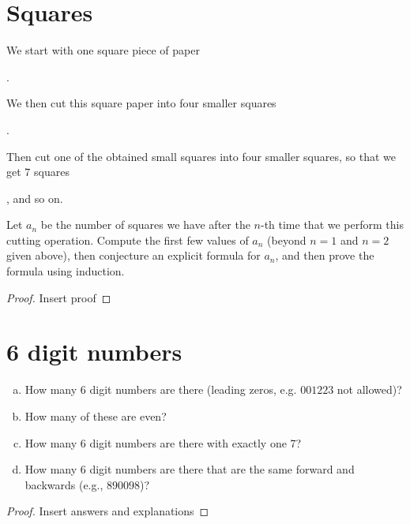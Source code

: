 \documentclass[12pt]{amsart}
\begin{document}
\section{Squares}
We start with one square piece of paper 
.

We then cut this square paper into four smaller squares
.

Then cut one of the obtained small squares into four smaller squares, so that we get $7$ squares 
 \hspace {-1cm}
, 
and so on.

Let $a_n$ be the number of squares we have after the $n$-th time that we perform this cutting operation. 
Compute the first few values of $a_n$ (beyond $n=1$ and $n=2$ given above), then conjecture an explicit formula for $a_n$, and then prove the formula using induction.
\begin{proof}
Insert proof
\end{proof}



\section{6 digit numbers}
\begin{enumerate}[a)]
    \item  How many $6$ digit numbers are there (leading zeros, e.g. $001223$ not allowed)? 
    \item How many of these are even? 
    \item How many 6 digit numbers are there with exactly one 7? 
    \item How many 6 digit numbers are there that are the same forward and backwards (e.g., $890098$)?
\end{enumerate}

\begin{proof}
Insert answers and explanations
\end{proof}
\end{document}
